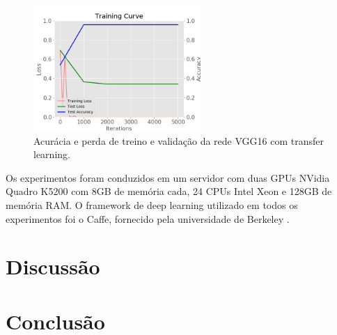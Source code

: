 \documentclass[conference]{IEEEtran}
\begin{document}
  \begin{figure}[!tp]
    \centering
    \includegraphics[width=2.5in]{img/curve_vgg16.png}
    \caption{Acurácia e perda de treino e validação da rede VGG16 com transfer learning.}
    \label{fig:acuracia_vgg16_transfer}
  \end{figure}

  Os experimentos foram conduzidos em um servidor com duas GPUs NVidia Quadro K5200 com 8GB de memória cada, 24 CPUs Intel Xeon e 128GB de memória RAM. O framework de deep learning utilizado em todos os experimentos foi o Caffe, fornecido pela universidade de Berkeley \cite{jia2014caffe}.





\section{Discussão}




\section{Conclusão}






\end{document}
